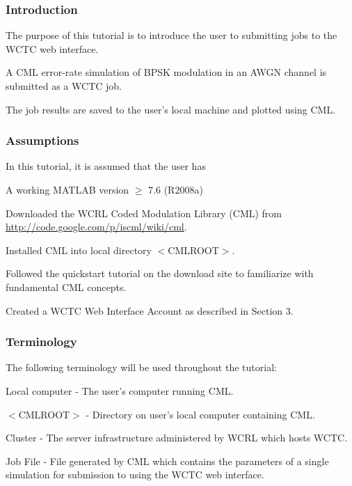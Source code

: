 
\begin{frame}
  \frametitle{Introduction}
\begin{itemize_loose}
\item The purpose of this tutorial is to introduce the user to submitting jobs to the WCTC web interface.

\item A CML error-rate simulation of BPSK modulation in an AWGN channel is submitted as a WCTC job.

\item The job results are saved to the user's local machine and plotted using CML.
\end{itemize_loose}

\end{frame}


\begin{frame}
\frametitle{Assumptions}
In this tutorial, it is assumed that the user has
\begin{itemize_loose}
\item A working MATLAB version $\geq$ 7.6 (R2008a)
\item Downloaded the WCRL Coded Modulation Library (CML) from \url{http://code.google.com/p/iscml/wiki/cml}.
\item Installed CML into local directory $<$CMLROOT$>$.
\item Followed the quickstart tutorial on the download site to familiarize with fundamental CML concepts.
\item Created a WCTC Web Interface Account as described in Section 3.
\end{itemize_loose}

\end{frame}

\begin{frame}
\frametitle{Terminology}
The following terminology will be used throughout the tutorial:
\begin{itemize_loose}
\item Local computer - The user's computer running CML.
\item $<$CMLROOT$>$ - Directory on user's local computer containing CML.
\item Cluster - The server infrastructure administered by WCRL which hosts WCTC.
\item Job File - File generated by CML which contains the parameters of a single simulation for submission to using the WCTC web interface.
\end{itemize_loose}
\end{frame}


